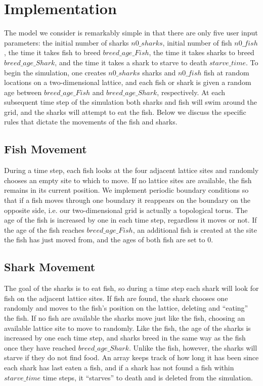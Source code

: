 \documentclass[aps,prl,preprint,superscriptaddress]{revtex4}
\begin{document}
\section{Implementation}

The model we consider is remarkably simple in that there are only five user input parameters: the initial number of sharks $n0\_sharks$, initial number of fish $n0\_fish$, the time it takes fish to breed $breed\_age\_Fish$, the time it takes sharks to breed $breed\_age\_Shark$, and the time it takes a shark to starve to death $starve\_time$. To begin the simulation, one creates $n0\_sharks$ sharks and $n0\_fish$ fish at random locations on a two-dimensional lattice, and each fish or shark is given a random age between $breed\_age\_Fish$ and $breed\_age\_Shark$, respectively. At each subsequent time step of the simulation both sharks and fish will swim around the grid, and the sharks will attempt to eat the fish. Below we discuss the specific rules that dictate the movements of the fish and sharks.

\subsection{Fish Movement}
During a time step, each fish looks at the four adjacent lattice sites and randomly chooses an empty site to which to move. If no lattice sites are available, the fish remains in its current position. We implement periodic boundary conditions so that if a fish moves through one boundary it reappears on the boundary on the opposite side, i.e. our two-dimensional grid is actually a topological torus. The age of the fish is increased by one in each time step, regardless it moves or not. If the age of the fish reaches $breed\_age\_Fish$, an additional fish is created at the site the fish has just moved from, and the ages of both fish are set to 0.

\subsection{Shark Movement}
The goal of the sharks is to eat fish, so during a time step each shark will look for fish on the adjacent lattice sites. If fish are found, the shark chooses one randomly and moves to the fish's position on the lattice, deleting and ``eating'' the fish. If no fish are available the sharks move just like the fish, choosing an available lattice site to move to randomly. Like the fish, the age of the sharks is increased by one each time step, and sharks breed in the same way as the fish once they have reached $breed\_age\_Shark$. Unlike the fish, however, the sharks will starve if they do not find food. An array keeps track of how long it has been since each shark has last eaten a fish, and if a shark has not found a fish within $starve\_time$ time steps, it ``starves'' to death and is deleted from the simulation.
\end{document}
